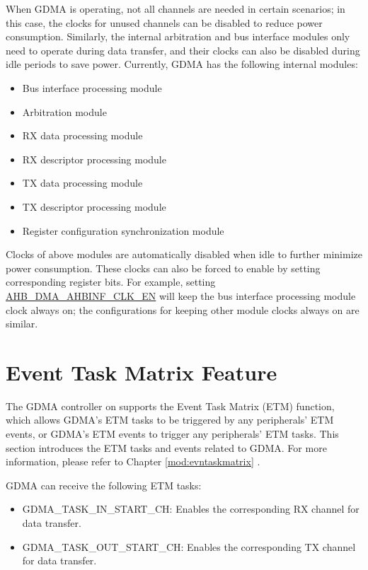 \documentclass[main\_\_EN.tex]{subfiles}
\begin{document}
When GDMA is operating, not all channels are needed in certain scenarios; in this case, the clocks for unused channels can be disabled to reduce power consumption. Similarly, the internal arbitration and bus interface modules only need to operate during data transfer, and their clocks can also be disabled during idle periods to save power. Currently, GDMA has the following internal modules:
\begin{itemize}
    \item Bus interface processing module
    \item Arbitration module
    \item RX data processing module
    \item RX descriptor processing module
    \item TX data processing module
    \item TX descriptor processing module
    \item Register configuration synchronization module
\end{itemize}

Clocks of above modules are automatically disabled when idle to further minimize power consumption. These clocks can also be forced to enable by setting corresponding register bits. For example, setting \hyperref[fielddesc:AHBDMAAHBINFCLKEN]{AHB\_DMA\_AHBINF\_CLK\_EN} will keep the bus interface processing module clock always on; the configurations for keeping other module clocks always on are similar.


\section{Event Task Matrix Feature}\label{sec:dma-etm-func}

The GDMA controller on \chipname{} supports the Event Task Matrix (ETM) function, which allows GDMA's ETM tasks to be triggered by any peripherals' ETM events, or GDMA's ETM events to trigger any peripherals' ETM tasks. This section introduces the ETM tasks and events related to GDMA. For more information, please refer to Chapter \ref{mod:evntaskmatrix} .

GDMA can receive the following ETM tasks:

\begin{itemize}
    \item GDMA\_TASK\_IN\_START\_CH: Enables the corresponding RX channel  for data transfer.
    \item GDMA\_TASK\_OUT\_START\_CH: Enables the corresponding TX channel  for data transfer.
\end{itemize}
\end{document}
